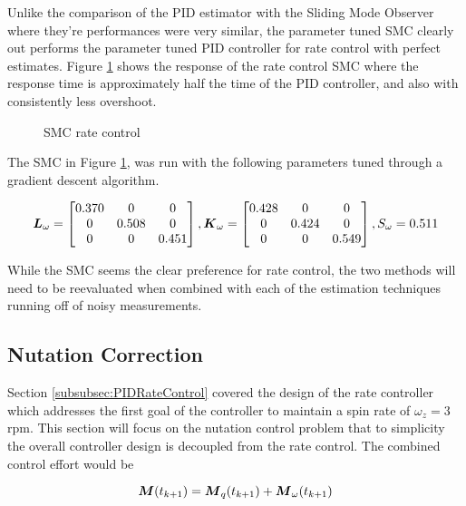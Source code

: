 Unlike the comparison of the PID estimator with the Sliding Mode Observer where they're performances were very similar, the parameter tuned SMC clearly out performs the parameter tuned PID controller for rate control with perfect estimates.  Figure \ref{fig:SMCRateControl} shows the response of the rate control SMC where the response time is approximately half the time of the PID controller, and also with consistently less overshoot.

\begin{figure}[H]
  \centerline{}
  \caption{SMC rate control}
  \label{fig:SMCRateControl}
\end{figure}

The SMC in Figure \ref{fig:SMCRateControl}, was run with the following parameters tuned through a gradient descent algorithm.

\begin{equation}
    \boldsymbol{L}_{\omega} = \begin{bmatrix} 0.370 & 0 & 0 \\ 0 & 0.508 & 0 \\ 0 & 0 & 0.451 \end{bmatrix},
    \boldsymbol{K}_{\omega} = \begin{bmatrix} 0.428 & 0 & 0 \\ 0 & 0.424 & 0 \\ 0 & 0 & 0.549 \end{bmatrix},
    S_{\omega} = 0.511
  \label{SMCRateControlGains}
\end{equation}

While the SMC seems the clear preference for rate control, the two methods will need to be reevaluated when combined with each of the estimation techniques running off of noisy measurements.

\subsection{Nutation Correction}
\label{subsec:NutationCorrection}

Section \ref{subsubsec:PIDRateControl} covered the design of the rate controller which addresses the first goal of the controller to maintain a spin rate of $\omega_z = 3$ rpm.  This section will focus on the nutation control problem that to simplicity the overall controller design is decoupled from the rate control.  The combined control effort would be

\begin{equation}
    \boldsymbol{M}(t_{k+1}) = \boldsymbol{M}_{q}(t_{k+1}) + \boldsymbol{M}_{\omega}(t_{k+1})
\end{equation}

